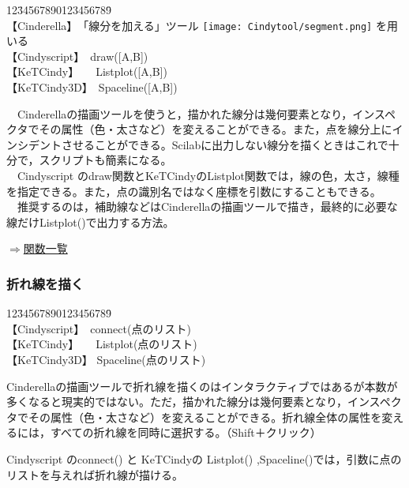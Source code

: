 \documentclass[papersize,a4paper,12pt,uplatex]{jsarticle}
\begin{document}
\begin{tabbing}
12\=34567890123456789\=\kill\\

\>【Cinderella】　\>「線分を加える」ツール \texttt{[image: Cindytool/segment.png]} を用いる　\\ 
\>【Cindyscript】　\>draw([A,B])　\\
 \>【KeTCindy】　　\>Listplot([A,B])　\\
 \>【KeTCindy3D】　\>Spaceline([A,B])　\\
\end{tabbing}
　Cinderellaの描画ツールを使うと，描かれた線分は幾何要素となり，インスペクタでその属性（色・太さなど）を変えることができる。また，点を線分上にインシデントさせることができる。Scilabに出力しない線分を描くときはこれで十分で，スクリプトも簡素になる。\\
　Cindyscript のdraw関数とKeTCindyのListplot関数では，線の色，太さ，線種を指定できる。また，点の識別名ではなく座標を引数にすることもできる。\\
　推奨するのは，補助線などはCinderellaの描画ツールで描き，最終的に必要な線だけListplot()で出力する方法。\\
\begin{flushright} \hyperlink{functionlist3d}{$\Rightarrow$関数一覧}\end{flushright}


\subsubsection{折れ線を描く}

\begin{tabbing}
12\=34567890123456789\=\kill\\

\>【Cindyscript】　\>connect(点のリスト)\\
\>【KeTCindy】　　\>Listplot(点のリスト)\\
\>【KeTCindy3D】  \>Spaceline(点のリスト)\\
\end{tabbing}

Cinderellaの描画ツールで折れ線を描くのはインタラクティブではあるが本数が多くなると現実的ではない。ただ，描かれた線分は幾何要素となり，インスペクタでその属性（色・太さなど）を変えることができる。折れ線全体の属性を変えるには，すべての折れ線を同時に選択する。（Shift＋クリック）

Cindyscript のconnect() と KeTCindyの Listplot() ,Spaceline()では，引数に点のリストを与えれば折れ線が描ける。
\end{document}
